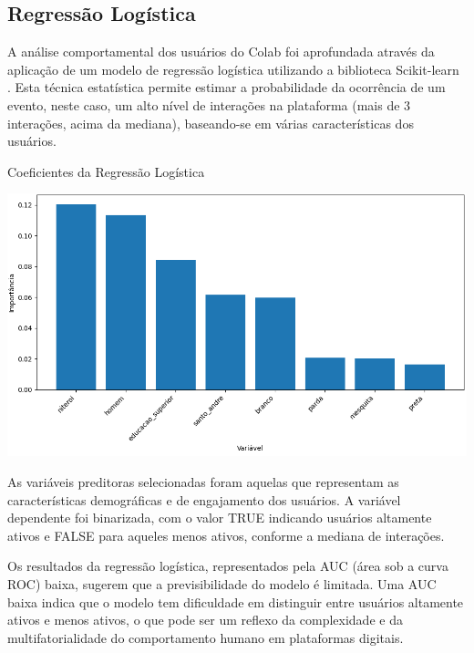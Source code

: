 \subsection*{Regressão Logística}

A análise comportamental dos usuários do Colab foi aprofundada através da aplicação de um modelo de regressão logística \cite{2010_Yu} utilizando a biblioteca Scikit-learn \cite{2011_Pedregosa}. Esta técnica estatística permite estimar a probabilidade da ocorrência de um evento, neste caso, um alto nível de interações na plataforma (mais de 3 interações, acima da mediana), baseando-se em várias características dos usuários.

\begin{quadro}[!htb]
	\caption{Coeficientes da Regressão Logística}
	\label{fig:regression_chart}
	\centering
	\includegraphics[scale=0.6]{images/regression_chart.png}
\end{quadro}

As variáveis preditoras selecionadas foram aquelas que representam as características demográficas e de engajamento dos usuários. A variável dependente foi binarizada, com o valor TRUE indicando usuários altamente ativos e FALSE para aqueles menos ativos, conforme a mediana de interações.

Os resultados da regressão logística, representados pela AUC (área sob a curva ROC) baixa, sugerem que a previsibilidade do modelo é limitada. Uma AUC baixa indica que o modelo tem dificuldade em distinguir entre usuários altamente ativos e menos ativos, o que pode ser um reflexo da complexidade e da multifatorialidade do comportamento humano em plataformas digitais.

